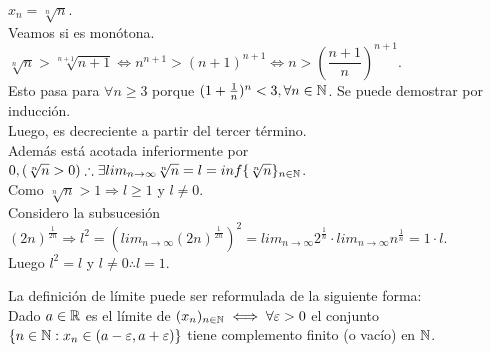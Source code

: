\begin{eg}
  $x_n = \sqrt[n]{n}$. \\
  Veamos si es monótona. $\sqrt[n]{n} > \sqrt[n+1]{n+1} \iff n^{n+1} > (n+1)^{n+1} \iff n > (\dfrac{n+1}{n})^{n+1}$. \\
  Esto pasa para $\forall n \geq 3$ porque $(1+\frac{1}{n})^n < 3, \forall n \in \mathbb{N}$. Se puede demostrar por inducción. \\
  Luego, es decreciente a partir del tercer término. \\
  Además está acotada inferiormente por $0, (\sqrt[n]{n} > 0) \therefore \exists lim_{n \to \infty} \sqrt[n]{n} = l = inf\{ \sqrt[n]{n} \}_{n \in \mathbb{N}}$. \\
  Como $\sqrt[n]{n} > 1 \Rightarrow l \geq 1$ y $l \neq 0$. \\
  Considero la subsucesión $(2n)^{\frac{1}{2n}} \Rightarrow l^2 = (lim_{n \to \infty} (2n)^{\frac{1}{2n}})^2 = lim_{n \to \infty} 2^{\frac{1}{n}} \cdot lim_{n \to \infty} n^{\frac{1}{n}} = 1 \cdot l$. \\
  Luego $l^2 = l$ y $l \neq 0 \therefore l = 1$.
\end{eg}

\begin{note}
  La definición de límite puede ser reformulada de la siguiente forma: \\
  Dado $a \in \mathbb{R}$ es el límite de $(x_n)_{n \in \mathbb{N}} \iff \forall \varepsilon > 0$ el conjunto $\{ n \in \mathbb{N} : x_n \in (a - \varepsilon, a + \varepsilon) \}$ tiene complemento finito (o vacío) en $\mathbb{N}$.
\end{note}

